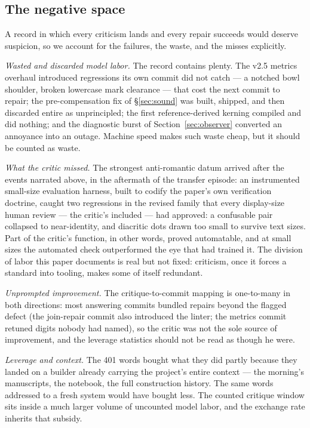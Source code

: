 \documentclass[11pt]{article}
\begin{document}
\subsection{The negative space}\label{sec:negative}

A record in which every criticism lands and every repair succeeds would deserve suspicion, so we account for the failures, the waste, and the misses explicitly.

\emph{Wasted and discarded model labor.} The record contains plenty. The v2.5 metrics overhaul introduced regressions its own commit did not catch — a notched bowl shoulder, broken lowercase mark clearance — that cost the next commit to repair; the pre-compensation fix of \S\ref{sec:sound} was built, shipped, and then discarded entire as unprincipled; the first reference-derived kerning compiled and did nothing; and the diagnostic burst of Section~\ref{sec:observer} converted an annoyance into an outage. Machine speed makes such waste cheap, but it should be counted as waste.

\emph{What the critic missed.} The strongest anti-romantic datum arrived after the events narrated above, in the aftermath of the transfer episode: an instrumented small-size evaluation harness, built to codify the paper's own verification doctrine, caught two regressions in the revised family that every display-size human review — the critic's included — had approved: a confusable pair collapsed to near-identity, and diacritic dots drawn too small to survive text sizes. Part of the critic's function, in other words, proved automatable, and at small sizes the automated check outperformed the eye that had trained it. The division of labor this paper documents is real but not fixed: criticism, once it forces a standard into tooling, makes some of itself redundant.

\emph{Unprompted improvement.} The critique-to-commit mapping is one-to-many in both directions: most answering commits bundled repairs beyond the flagged defect (the join-repair commit also introduced the linter; the metrics commit retuned digits nobody had named), so the critic was not the sole source of improvement, and the leverage statistics should not be read as though he were.

\emph{Leverage and context.} The 401 words bought what they did partly because they landed on a builder already carrying the project's entire context — the morning's manuscripts, the notebook, the full construction history. The same words addressed to a fresh system would have bought less. The counted critique window sits inside a much larger volume of uncounted model labor, and the exchange rate inherits that subsidy.
\end{document}
